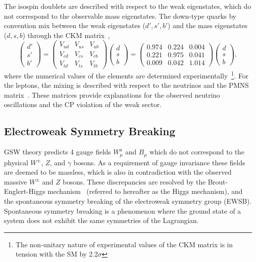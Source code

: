 The isospin doublets are described with respect to the weak eigenstates, which do not correspond to the observable mass eigenstates.
The down-type quarks by convention mix between the weak eigenstates ($d', s', b'$) and the mass eigenstates ($d, s, b$) through the CKM matrix~\cite{cabibbo1963},
\begin{equation}
	\label{eq:ckm_matrix}
	\begin{pmatrix} d' \\ s' \\ b' \end{pmatrix} =
	\begin{pmatrix} V_{ud} & V_{us} & V_{ub} \\ V_{cd} & V_{cs} & V_{cb} \\ V_{td} & V_{ts} & V_{tb} \end{pmatrix} \begin{pmatrix} d \\ s \\ b \end{pmatrix} =
	\begin{pmatrix} 0.974 & 0.224 & 0.004 \\ 0.221 & 0.975 & 0.041 \\ 0.009 & 0.042 & 1.014 \end{pmatrix} \begin{pmatrix} d \\ s \\ b \end{pmatrix},
\end{equation}
where the numerical values of the elements are determined experimentally~\cite{ParticleDataGroup}\footnote{The non-unitary nature of experimental values of the CKM matrix is in tension with the SM by 2.2$\sigma$}.
For the leptons, the mixing is described with respect to the neutrinos and the PMNS matrix~\cite{pontecorvo1967, maki1962}.
These matrices provide explanations for the observed neutrino oscillations and the CP violation of the weak sector.

\subsection{Electroweak Symmetry Breaking}
\label{sec:higgs}

GSW theory predicts 4 gauge fields $W^a_\mu$ and $B_\mu$ which do not correspond to the physical $W^\pm$, $Z$, and $\gamma$ bosons.
As a requirement of gauge invariance these fields are deemed to be massless, which is also in contradiction with the observed massive $W^\pm$ and $Z$ bosons.
These discrepancies are resolved by the Brout-Englert-Higgs mechanism~\cite{higgs1964, englert1964, brout1964} (referred to hereafter as the Higgs mechanism), and the spontaneous symmetry breaking of the electroweak symmetry group (EWSB).
Spontaneous symmetry breaking is a phenomenon where the ground state of a system does not exhibit the same symmetries of the Lagrangian.

